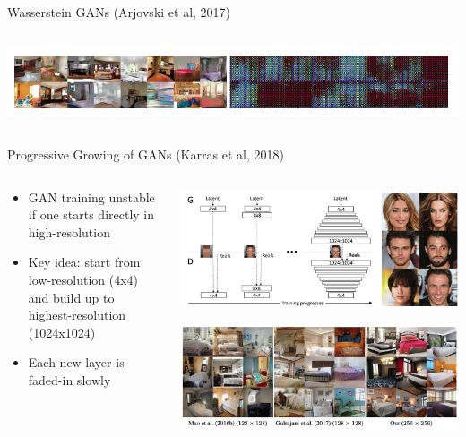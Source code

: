 \documentclass[8pt,xcolor=table,aspectratio=169]{beamer}
\begin{document}
\begin{frame}{Wasserstein GANs (Arjovski et al, 2017)}
\begin{columns}
\begin{column}{0.5\textwidth}
\includegraphics[width=\textwidth]{nMnEATk.png}


\end{column}
\end{columns}
  

\end{frame}

\begin{frame}{Progressive Growing of GANs (Karras et al, 2018)}
\begin{columns}
\begin{column}{0.5\textwidth}
\begin{itemize}
 \item GAN training unstable if one starts directly in high-resolution
 
 \vspace{2em} 
 
 \item Key idea: start from low-resolution (4x4) and build up to highest-resolution (1024x1024)
 
 \vspace{2em} 
 
 \item Each new layer is faded-in slowly
\end{itemize}
\end{column}
\begin{column}{0.5\textwidth}
\centering
\includegraphics[width=\textwidth]{ZzLPY30.png}

\vspace{2em}

\includegraphics[width=\textwidth]{CP4yMsg.png}
\end{column}
\end{columns}

\end{frame}
\end{document}
